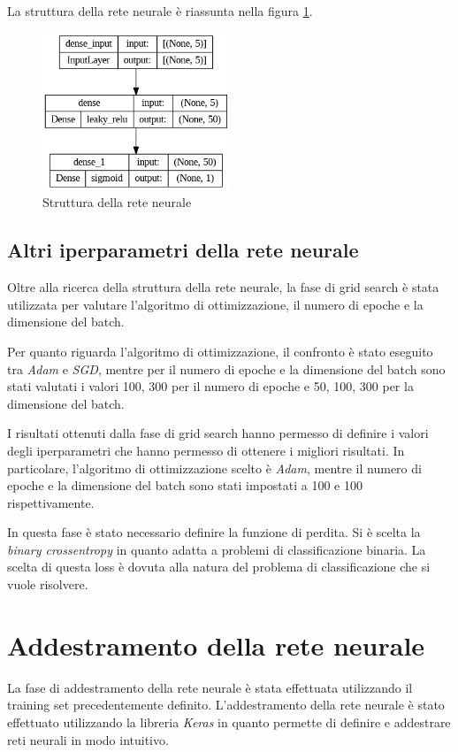 La struttura della rete neurale è riassunta nella figura \ref{fig:strutturaReteNeurale}.
\begin{figure}[!ht]
    \centering
    \includegraphics[width=0.5\textwidth]{img/rete/struttura_rete.png}
    \caption{Struttura della rete neurale}
    \label{fig:strutturaReteNeurale}
\end{figure}
\subsection*{Altri iperparametri della rete neurale} %
Oltre alla ricerca della struttura della rete neurale, la fase di grid search è
stata utilizzata per valutare l'algoritmo di ottimizzazione, il numero di epoche
e la dimensione del batch.

Per quanto riguarda l'algoritmo di ottimizzazione, il confronto è stato eseguito
tra \textit{Adam} e \textit{SGD}, mentre per il numero di epoche e la dimensione
del batch sono stati valutati i valori 100, 300 per il numero di epoche e 50,
100, 300 per la dimensione del batch.

I risultati ottenuti dalla fase di grid search hanno permesso di definire i valori
degli iperparametri che hanno permesso di ottenere i migliori risultati. In
particolare, l'algoritmo di ottimizzazione scelto è \textit{Adam}, mentre il
numero di epoche e la dimensione del batch sono stati impostati a 100 e 100
rispettivamente.

In questa fase è stato necessario definire la funzione di perdita. Si è scelta
la \textit{binary crossentropy} in quanto adatta a problemi di classificazione
binaria. La scelta di questa loss è dovuta alla natura del problema di
classificazione che si vuole risolvere.
\section{Addestramento della rete neurale}
La fase di addestramento della rete neurale è stata effettuata utilizzando il
training set precedentemente definito. L'addestramento della rete neurale è stato
effettuato utilizzando la libreria \textit{Keras} in quanto permette di definire
e addestrare reti neurali in modo intuitivo.
